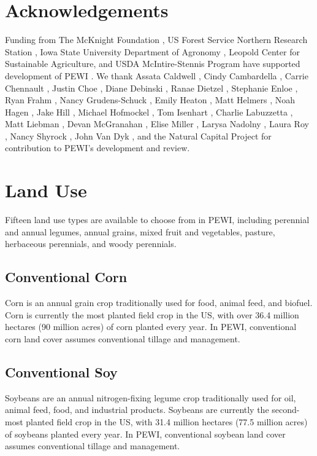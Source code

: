 \documentclass[11pt]{article}
\begin{document}
\section*{Acknowledgements}
Funding from The McKnight Foundation , US Forest Service Northern Research Station , Iowa State University Department of Agronomy , Leopold Center for Sustainable Agriculture, and USDA McIntire-Stennis Program have supported development of PEWI . We thank Assata Caldwell , Cindy Cambardella , Carrie Chennault , Justin Choe , Diane Debinski , Ranae Dietzel , Stephanie Enloe , Ryan Frahm , Nancy Grudens-Schuck , Emily Heaton , Matt Helmers , Noah Hagen , Jake Hill , Michael Hofmockel , Tom Isenhart , Charlie Labuzzetta , Matt Liebman , Devan McGranahan , Elise Miller , Larysa Nadolny , Laura Roy , Nancy Shyrock , John Van Dyk , and the Natural Capital Project for contribution to PEWI’s development and review.
\cleardoublepage


\tableofcontents
\thispagestyle{empty} %
\cleardoublepage %

\setcounter{page}{1}


\section{Land Use}\label{sec:landuse}
Fifteen land use types are available to choose from in PEWI, including perennial and annual legumes, annual grains, mixed fruit and vegetables, pasture, herbaceous perennials, and woody perennials.

\subsection{Conventional Corn}
Corn is an annual grain crop traditionally used for food, animal feed, and biofuel. Corn is currently the most planted field crop in the US, with over 36.4 million hectares (90 million acres) of corn planted every year\cite{1}.  In PEWI, conventional corn land cover assumes conventional tillage and management.

\subsection{Conventional Soy}
Soybeans are an annual nitrogen-fixing legume crop traditionally used for oil, animal feed, food, and industrial products. Soybeans are currently the second-most planted field crop in the US, with 31.4 million hectares (77.5 million acres) of soybeans planted every year\cite{2}.  In PEWI, conventional soybean land cover assumes conventional tillage and management.
\end{document}
